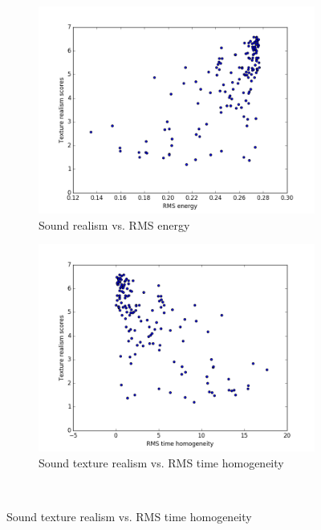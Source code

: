 \documentclass{sig-alternate-05-2015}
\begin{document}
    \begin{figure}[hbt]
    \centering
    \begin{subfigure}[b]{0.45\textwidth}
      \centering
      \includegraphics[width=\textwidth]{figures/rms_energy.png}
      \caption{Sound realism vs. RMS energy}
      \label{fig:rmsenergy}
    \end{subfigure}
    \hfill 
    \begin{subfigure}[b]{0.45\textwidth}
      \centering
      \includegraphics[width=\textwidth]{figures/rms_time_homogeneity.png}
      \caption{Sound texture realism vs. RMS time homogeneity}
      \label{fig:rmshomog}
    \end{subfigure}
    \\

\end{figure}
\end{document}
